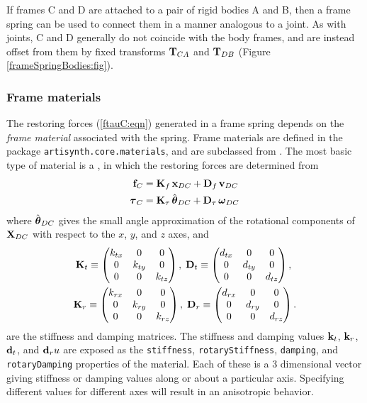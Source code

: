 If frames C and D are attached to a pair of rigid bodies A and B, then
a frame spring can be used to connect them in a manner analogous to a
joint. As with joints, C and D generally do not coincide with the body
frames, and are instead offset from them by fixed transforms ${\bf T}_{CA}$
and ${\bf T}_{DB}$ (Figure \ref{frameSpringBodies:fig}).

\subsubsection{Frame materials}

The restoring forces (\ref{ftauC:eqn}) generated in a frame spring
depends on the {\it frame material} associated with the spring. Frame
materials are defined in the package {\tt artisynth.core.materials},
and are subclassed from
.
The most basic type of material is a 
,
in which the restoring forces are determined from
%
\begin{align*}
{\bf f}_C & = 
{\bf K}_{f} \, {\bf x}_{DC} + {\bf D}_{f} \, {\bf v}_{DC} \\
\boldsymbol\tau_C & = 
{\bf K}_{\tau} \, \hat{\boldsymbol\theta}_{DC} + {\bf D}_{\tau} \, \boldsymbol\omega_{DC}
\label{flinear:eqn}
\end{align*}
%
where $\hat{\boldsymbol\theta}_{DC}$ gives the small angle approximation of the
rotational components of ${\bf X}_{DC}$ with respect to the $x$, $y$, and
$z$ axes, and
%
\begin{gather*}
{\bf K}_{t} \equiv 
\left(\begin{matrix} k_{tx} & 0 & 0 \\ 0 & k_{ty} & 0 \\ 0 & 0 & k_{tz} \end{matrix}\right), \;
{\bf D}_{t} \equiv 
\left(\begin{matrix} d_{tx} & 0 & 0 \\ 0 & d_{ty} & 0 \\ 0 & 0 & d_{tz} \end{matrix}\right), \;\\
{\bf K}_{r} \equiv
\left(\begin{matrix} k_{r x} & 0 & 0 \\ 0 & k_{r y} & 0 \\ 0 & 0 & k_{r z} \end{matrix}\right), \;
{\bf D}_{r} \equiv
\left(\begin{matrix} d_{r x} & 0 & 0 \\ 0 & d_{r y} & 0 \\ 0 & 0 & d_{r z} \end{matrix}\right).
\end{gather*}
%
are the stiffness and damping matrices. The stiffness and damping
values ${\bf k}_t$, ${\bf k}_r$, ${\bf d}_t$, and ${\bf d}_ru$ are exposed as the
{\tt stiffness}, {\tt rotaryStiffness}, {\tt damping}, and {\tt
rotaryDamping} properties of the material. Each of these is a 3
dimensional vector giving stiffness or damping values along or about a
particular axis. Specifying different values for different axes will
result in an anisotropic behavior.

